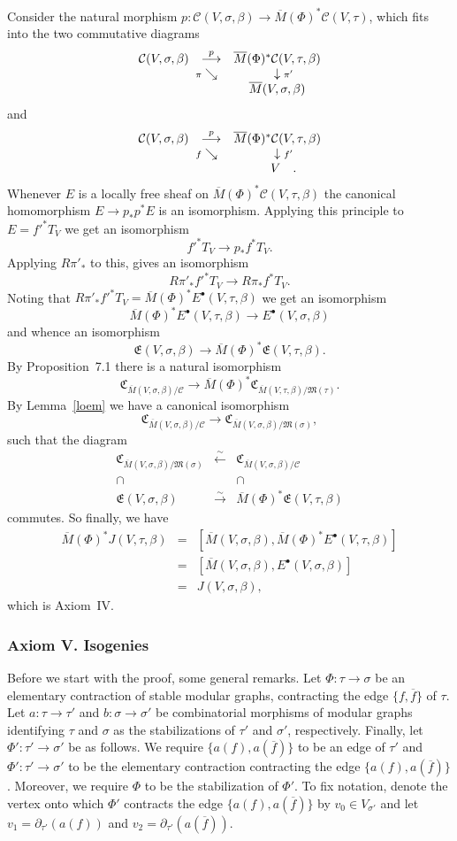 \documentclass[11pt]{article}
\newcommand{\CC}{\mathfrak{C}}
\newcommand{\EE}{\mathfrak{E}}
\newcommand{\MM}{\mathfrak{M}}
\newcommand{\cC}{\mathcal{C}}
\newcommand{\com}{^{\scriptscriptstyle\bullet}}
\newcommand{\comtri}[6]{
\begin{array}{ccc}
#1 & \stackrel{#2}{\longrightarrow} & #3         \\
   & \sediag{#4}                    & \rdiag{#5} \\
   &                                & #6
\end{array}}
\newcommand{\del}{\partial}
\newcommand{\longiso}{\stackrel{\textstyle\sim}{\longrightarrow}}
\newcommand{\longisoback}{\stackrel{\textstyle\sim}{\longleftarrow}}
\newcommand{\lst}{_{\ast}}
\newcommand{\ol}{\overline}
\newcommand{\rdiag}[1]{\makebox[0cm]{\(\phantom{\scriptstyle#1}\downarrow{\scriptstyle#1}\)}}
\newcommand{\sediag}[1]{\makebox[0cm]{\({\scriptstyle#1}\searrow\phantom{\scriptstyle#1}\)}}
\newcommand{\upst}{^{\ast}}
\theoremstyle{plain}
\theoremstyle{remark}
\theoremstyle{plain}
\theoremstyle{definition}
\theoremstyle{remark}
\begin{document}
Consider the natural morphism
\(p:\cC(V,\sigma,\beta)\rightarrow\ol{M}(\Phi)\upst\cC(V,\tau)\), which
fits into the two commutative diagrams
\[
\comtri{\cC(V,\sigma,\beta)}{p}{\ol{M}(\Phi)\upst \cC(V,\tau,\beta)}
{\pi} {\pi'} {\ol{M}(V,\sigma,\beta)}
\]
and
\[
\comtri{\cC(V,\sigma,\beta)}{p}{\ol{M}(\Phi)\upst \cC(V,\tau,\beta)}
{f}{f'}{\quad V\quad.}
\]
Whenever \(E\) is a locally free sheaf on
\(\ol{M}(\Phi)\upst\cC(V,\tau,\beta)\) the canonical homomorphism
\(E\rightarrow p\lst p\upst E\) is an isomorphism. Applying this
principle to \(E={f'}\upst T_V\) we get an isomorphism
\[
{f'}\upst T_V\longrightarrow p\lst f\upst T_V.
\]
Applying \(R\pi'\lst\) to this, gives an isomorphism
\[
R\pi'\lst {f'}\upst T_V\longrightarrow R\pi\lst f\upst T_V.
\]
Noting that \(R\pi'\lst{f'}\upst T_V=\ol{M}(\Phi)\upst
E\com(V,\tau,\beta)\) we get an isomorphism
\[
\ol{M}(\Phi)\upst E\com(V,\tau,\beta)\longrightarrow
E\com(V,\sigma,\beta)
\]
and whence an isomorphism
\[
\EE(V,\sigma,\beta)\longrightarrow\ol{M}(\Phi)\upst
\EE(V,\tau,\beta).
\]
By \cite{BF} Proposition~7.1 there is a natural isomorphism
\[
\CC_{\ol{M}(V,\sigma,\beta)/\cC}\longrightarrow\ol{M}(\Phi)\upst
\CC_{\ol{M}(V,\tau,\beta)/\MM(\tau)}.
\]
By Lemma~\ref{loem} we have a canonical isomorphism
\[
\CC_{\ol{M}(V,\sigma,\beta)/\cC}\longrightarrow
\CC_{\ol{M}(V,\sigma,\beta)/\MM(\sigma)},
\]
such that the diagram
\[
\begin{array}{ccc}
\CC_{\ol{M}(V,\sigma,\beta)/\MM(\sigma)} & \longisoback &
\CC_{\ol{M}(V,\sigma,\beta)/\cC} \\
\cap & & \cap\\
\EE(V,\sigma,\beta) & \longiso  & \ol{M}(\Phi)\upst
\EE(V,\tau,\beta)\end{array}
\]
commutes. So finally, we have
\begin{eqnarray*}
\ol{M}(\Phi)\upst J(V,\tau,\beta) & = & [\ol{M}(V,\sigma,\beta),
\ol{M}(\Phi)\upst E\com(V,\tau,\beta)]\\
& = & [\ol{M}(V,\sigma,\beta),E\com(V,\sigma,\beta)]\\
& = & J(V,\sigma,\beta),
\end{eqnarray*}
which is Axiom~IV.

\subsubsection{{\sc Axiom V.} Isogenies}

Before we start with the proof, some general remarks. Let
\(\Phi:\tau\to\sigma\) be an elementary contraction of stable modular
graphs, contracting the edge \(\{f,\ol{f}\}\) of \(\tau\).  Let
\(a:\tau\rightarrow\tau'\) and \(b:\sigma\rightarrow\sigma'\) be
combinatorial morphisms of modular graphs identifying \(\tau\) and
\(\sigma\) as the stabilizations of \(\tau'\) and \(\sigma'\), respectively.
Finally, let \(\Phi':\tau'\to\sigma'\) be as follows. We require
\(\{a(f),a(\ol{f})\}\) to be an edge of \(\tau'\) and
\(\Phi':\tau'\to\sigma'\) to be the elementary contraction contracting
the edge \(\{a(f),a(\ol{f})\}\). Moreover, we require \(\Phi\) to be the
stabilization of \(\Phi'\). To fix notation, denote the vertex onto
which \(\Phi'\) contracts the edge \(\{a(f),a(\ol{f})\}\) by \(v_0\in
V_{\sigma'}\) and let \(v_1=\del_{\tau'}(a(f))\) and
\(v_2=\del_{\tau'}(a(\ol{f}))\).
\end{document}
